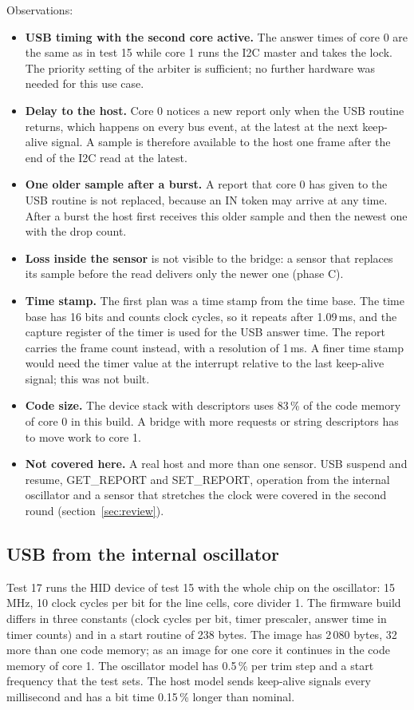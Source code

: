 \documentclass[10pt,a4paper]{article}
\begin{document}
Observations:
\begin{itemize}
\item \textbf{USB timing with the second core active.} The answer times of core 0 are the same as in test 15
while core 1 runs the I2C master and takes the lock. The priority setting of the arbiter is sufficient; no
further hardware was needed for this use case.
\item \textbf{Delay to the host.} Core 0 notices a new report only when the USB routine returns, which
happens on every bus event, at the latest at the next keep-alive signal. A sample is therefore available to
the host one frame after the end of the I2C read at the latest.
\item \textbf{One older sample after a burst.} A report that core 0 has given to the USB routine is not
replaced, because an IN token may arrive at any time. After a burst the host first receives this older sample
and then the newest one with the drop count.
\item \textbf{Loss inside the sensor} is not visible to the bridge: a sensor that replaces its sample before
the read delivers only the newer one (phase C).
\item \textbf{Time stamp.} The first plan was a time stamp from the time base. The time base has 16 bits and
counts clock cycles, so it repeats after 1.09\,ms, and the capture register of the timer is used for the USB
answer time. The report carries the frame count instead, with a resolution of 1\,ms. A finer time stamp
would need the timer value at the interrupt relative to the last keep-alive signal; this was not built.
\item \textbf{Code size.} The device stack with descriptors uses 83\,\% of the code memory of core 0 in this
build. A bridge with more requests or string descriptors has to move work to core 1.
\item \textbf{Not covered here.} A real host and more than one sensor. USB suspend and resume, GET\_REPORT and
SET\_REPORT, operation from the internal oscillator and a sensor that stretches the clock were covered in the
second round (section~\ref{sec:review}).
\end{itemize}

\subsection{USB from the internal oscillator}\label{sec:oscusb}

Test 17 runs the HID device of test 15 with the whole chip on the oscillator: 15\,MHz, 10 clock cycles per bit
for the line cells, core divider 1. The firmware build differs in three constants (clock cycles per bit, timer
prescaler, answer time in timer counts) and in a start routine of 238 bytes. The image has 2\,080 bytes, 32 more than one code memory; as an image for one core it continues in the code memory of core 1. The oscillator model has 0.5\,\%
per trim step and a start frequency that the test sets. The host model sends keep-alive signals every
millisecond and has a bit time 0.15\,\% longer than nominal.
\end{document}
